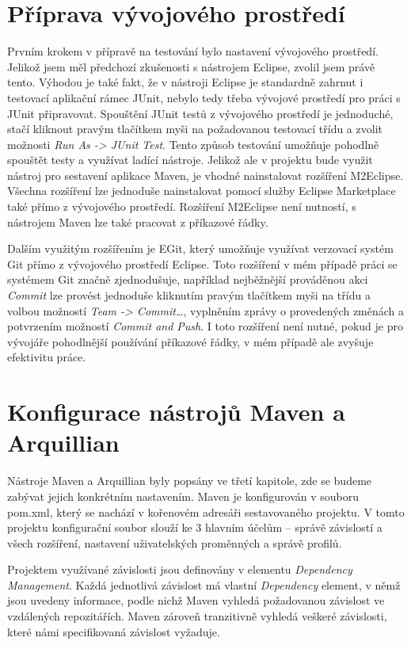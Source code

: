 \documentclass[
    color,   %
	table,   %
    twoside, %
]{fithesis3}
\begin{document}
\section{Příprava vývojového prostředí}
Prvním krokem v přípravě na testování bylo nastavení vývojového prostředí. Jelikož jsem měl předchozí zkušenosti s nástrojem Eclipse, zvolil jsem právě tento. Výhodou je také fakt, že v nástroji Eclipse je standardně zahrnut i testovací aplikační rámec JUnit, nebylo tedy třeba vývojové prostředí  pro práci s JUnit připravovat. Spouštění JUnit testů z vývojového prostředí je jednoduché, stačí kliknout pravým tlačítkem myši na požadovanou testovací třídu a zvolit možnosti \emph{Run As -> JUnit Test}. Tento způsob testování umožňuje pohodlně spouštět testy a využívat ladící nástroje. Jelikož ale v projektu bude využit nástroj pro sestavení aplikace Maven, je vhodné nainstalovat rozšíření M2Eclipse. Všechna rozšíření lze jednoduše nainstalovat pomocí služby Eclipse Marketplace také přímo z vývojového prostředí. Rozšíření M2Eclipse není nutností, s nástrojem Maven lze také pracovat z příkazové řádky.

Dalším využitým rozšířením je EGit, který umožňuje využívat verzovací systém Git přímo z vývojového prostředí Eclipse. Toto rozšíření v mém případě práci se systémem Git značně zjednodušuje, například nejběžnější prováděnou akci \emph{Commit} lze provést jednoduše kliknutím pravým tlačítkem myši na třídu a volbou možností \emph{Team -> Commit\ldots}, vyplněním zprávy o provedených změnách a potvrzením možností \emph{Commit and Push}. I toto rozšíření není nutné, pokud je pro vývojáře pohodlnější používání příkazové řádky, v mém případě ale zvyšuje efektivitu práce.

\section{Konfigurace nástrojů Maven a Arquillian}
Nástroje Maven a Arquillian byly popsány ve třetí kapitole, zde se budeme zabývat jejich konkrétním nastavením. Maven je konfigurován v souboru pom.xml, který se nachází v kořenovém adresáři sestavovaného projektu. V tomto projektu konfigurační soubor slouží ke 3 hlavním účelům – správě závislostí a všech rozšíření, nastavení uživatelských proměnných a správě profilů.

Projektem využívané závislosti jsou definovány v elementu \emph{Dependency Management}. Každá jednotlivá závislost má vlastní \emph{Dependency} element, v němž jsou uvedeny informace, podle nichž Maven vyhledá požadovanou závislost ve vzdálených repozitářích. Maven zároveň tranzitivně vyhledá veškeré závislosti, které námi specifikovaná závislost vyžaduje.
\end{document}
